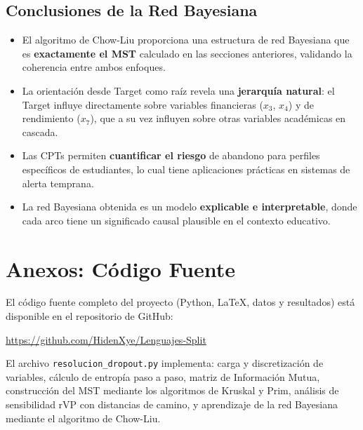 \documentclass[12pt,a4paper]{article}
\begin{document}
\subsection{Conclusiones de la Red Bayesiana}

\begin{itemize}
    \item El algoritmo de Chow-Liu proporciona una estructura de red Bayesiana que es \textbf{exactamente el MST} calculado en las secciones anteriores, validando la coherencia entre ambos enfoques.
    \item La orientación desde Target como raíz revela una \textbf{jerarquía natural}: el Target influye directamente sobre variables financieras ($x_3$, $x_4$) y de rendimiento ($x_7$), que a su vez influyen sobre otras variables académicas en cascada.
    \item Las CPTs permiten \textbf{cuantificar el riesgo} de abandono para perfiles específicos de estudiantes, lo cual tiene aplicaciones prácticas en sistemas de alerta temprana.
    \item La red Bayesiana obtenida es un modelo \textbf{explicable e interpretable}, donde cada arco tiene un significado causal plausible en el contexto educativo.
\end{itemize}

\newpage
\section{Anexos: Código Fuente}

El código fuente completo del proyecto (Python, LaTeX, datos y resultados) está disponible en el repositorio de GitHub:

\begin{center}
    \url{https://github.com/HidenXye/Lenguajes-Split}
\end{center}

El archivo \texttt{resolucion\_dropout.py} implementa: carga y discretización de variables, cálculo de entropía paso a paso, matriz de Información Mutua, construcción del MST mediante los algoritmos de Kruskal y Prim, análisis de sensibilidad rVP con distancias de camino, y aprendizaje de la red Bayesiana mediante el algoritmo de Chow-Liu.
\end{document}
